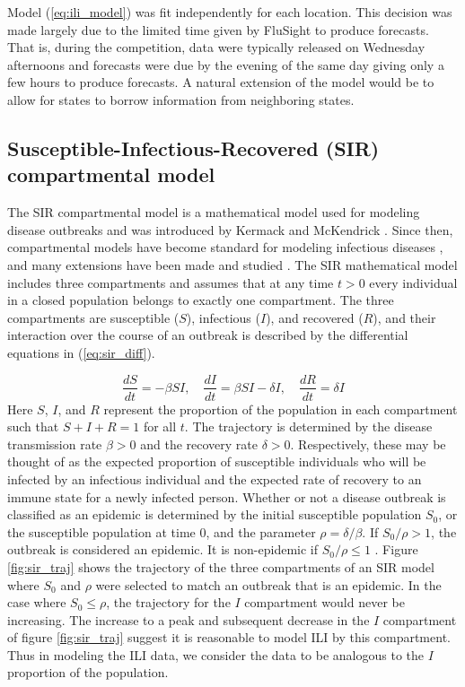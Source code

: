 Model (\ref{eq:ili_model}) was fit 
independently for each location. This decision was made largely due to the 
limited time given by FluSight to produce forecasts. That is,
during the competition, data were typically released on Wednesday afternoons and
forecasts were due by the evening of the same day giving only a few hours to 
produce forecasts. A natural extension of the model would be to allow for states
to borrow information from neighboring states.



\subsection{Susceptible-Infectious-Recovered (SIR) compartmental model} \label{sec:sir_func}

The SIR compartmental model is a mathematical model used for modeling disease 
outbreaks and was introduced by Kermack and McKendrick 
\cite[]{kermack1927contribution}. Since then, compartmental models have 
become standard for modeling infectious diseases 
\cite[]{allen2008mathematical}, and many extensions have been made and 
studied \cite[for example]{simon2020sir, allen2017primer, van2008deterministic}. 
The SIR mathematical model includes three compartments and assumes that at 
any time $t>0$ every individual in a closed population belongs to exactly 
one compartment. The three compartments are susceptible ($S$), infectious ($I$), 
and recovered ($R$), and their interaction over the course of an outbreak is 
described by the differential equations in (\ref{eq:sir_diff}).    

\begin{equation}
    \label{eq:sir_diff}
    \frac{dS}{dt} = -\beta SI, \quad \frac{dI}{dt} = \beta S I - \delta I, \quad \frac{dR}{dt} = \delta I
\end{equation}
Here $S$, $I$, and $R$ represent the proportion of the population in each 
compartment such that $S + I + R = 1$ for all $t$. The trajectory is 
determined by the disease transmission rate $\beta > 0$ and the recovery 
rate $\delta > 0$. Respectively, these may be thought of as the expected 
proportion of susceptible individuals who will be infected by an infectious 
individual and the expected rate of recovery to an immune state for a newly 
infected person. Whether or not a disease outbreak is classified as an 
epidemic is determined by the initial susceptible population $S_0$, or the 
susceptible population at time $0$, and the parameter $\rho = \delta/
\beta$. If $S_0/\rho > 1$, the outbreak is considered an epidemic. It is 
non-epidemic if $S_0/\rho \leq 1$ \cite[]{osthus2019dynamic}. Figure 
\ref{fig:sir_traj} shows the trajectory of the three compartments of an SIR 
model where $S_0$ and $\rho$ were selected to match an outbreak that is an 
epidemic. In the case where $S_0 \leq \rho$, the trajectory for the $I$ 
compartment would never be increasing. The increase to a peak and subsequent 
decrease in the $I$ compartment of figure \ref{fig:sir_traj} suggest it is 
reasonable to model ILI by this compartment. Thus in modeling the ILI data, 
we consider the data to be analogous to the $I$ proportion of the population.

